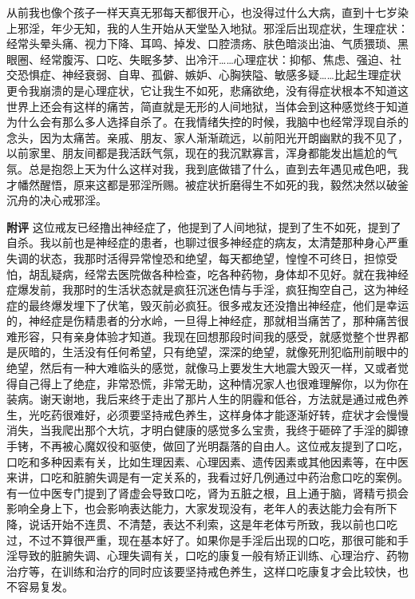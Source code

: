 \begin{case}
    从前我也像个孩子一样天真无邪每天都很开心，也没得过什么大病，直到十七岁染上邪淫，年少无知，我的人生开始从天堂坠入地狱。邪淫后出现症状，生理症状：经常头晕头痛、视力下降、耳鸣、掉发、口腔溃疡、肤色暗淡出油、气质猥琐、黑眼圈、经常腹泻、口吃、失眠多梦、出冷汗……心理症状：抑郁、焦虑、强迫、社交恐惧症、神经衰弱、自卑、孤僻、嫉妒、心胸狭隘、敏感多疑……比起生理症状更令我崩溃的是心理症状，它让我生不如死，悲痛欲绝，没有得症状根本不知道这世界上还会有这样的痛苦，简直就是无形的人间地狱，当体会到这种感觉终于知道为什么会有那么多人选择自杀了。在我情绪失控的时候，我脑中也经常浮现自杀的念头，因为太痛苦。亲戚、朋友、家人渐渐疏远，以前阳光开朗幽默的我不见了，以前家里、朋友间都是我活跃气氛，现在的我沉默寡言，浑身都能发出尴尬的气氛。总是抱怨上天为什么这样对我，我到底做错了什么，直到去年遇见戒色吧，我才幡然醒悟，原来这都是邪淫所赐。被症状折磨得生不如死的我，毅然决然以破釜沉舟的决心戒邪淫。

    \textbf{附评} 这位戒友已经撸出神经症了，他提到了人间地狱，提到了生不如死，提到了自杀。我以前也是神经症的患者，也聊过很多神经症的病友，太清楚那种身心严重失调的状态，我那时活得异常惶恐和绝望，每天都绝望，惶惶不可终日，担惊受怕，胡乱疑病，经常去医院做各种检查，吃各种药物，身体却不见好。就在我神经症爆发前，我那时的生活状态就是疯狂沉迷色情与手淫，疯狂掏空自己，这为神经症的最终爆发埋下了伏笔，毁灭前必疯狂。很多戒友还没撸出神经症，他们是幸运的，神经症是伤精患者的分水岭，一旦得上神经症，那就相当痛苦了，那种痛苦很难形容，只有亲身体验才知道。我现在回想那段时间我的感受，就感觉整个世界都是灰暗的，生活没有任何希望，只有绝望，深深的绝望，就像死刑犯临刑前眼中的绝望，然后有一种大难临头的感觉，就像马上要发生大地震大毁灭一样，又或者觉得自己得上了绝症，非常恐慌，非常无助，这种情况家人也很难理解你，以为你在装病。谢天谢地，我后来终于走出了那片人生的阴霾和低谷，方法就是通过戒色养生，光吃药很难好，必须要坚持戒色养生，这样身体才能逐渐好转，症状才会慢慢消失，当我爬出那个大坑，才明白健康的感觉多么宝贵，我终于砸碎了手淫的脚镣手铐，不再被心魔奴役和驱使，做回了光明磊落的自由人。这位戒友提到了口吃，口吃和多种因素有关，比如生理因素、心理因素、遗传因素或其他因素等，在中医来讲，口吃和脏腑失调是有一定关系的，我看过好几例通过中药治愈口吃的案例。有一位中医专门提到了肾虚会导致口吃，肾为五脏之根，且上通于脑，肾精亏损会影响全身上下，也会影响表达能力，大家发现没有，老年人的表达能力会有所下降，说话开始不连贯、不清楚，表达不利索，这是年老体亏所致，我以前也口吃过，不过不算很严重，现在基本好了。如果你是手淫后出现的口吃，那很可能和手淫导致的脏腑失调、心理失调有关，口吃的康复一般有矫正训练、心理治疗、药物治疗等，在训练和治疗的同时应该要坚持戒色养生，这样口吃康复才会比较快，也不容易复发。
\end{case}

